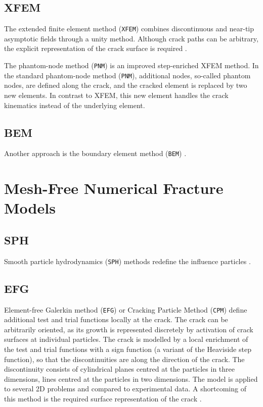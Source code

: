 \documentclass[format=acmtog, 12pt, screen=true, review=false]{acmart}
\begin{document}
\subsection{XFEM}

The extended finite element method (\texttt{XFEM}) \cite{Alt17, Xu10, Xu16} combines discontinuous and near-tip asymptotic fields through a unity method. \cite{Mun13} Although crack paths can be arbitrary, the explicit representation of the crack surface is required \cite{Rab04}. 

\bigbreak
The phantom-node method (\texttt{PNM}) \cite{VuB13} is an improved step-enriched XFEM method. In the standard phantom-node method (\texttt{PNM}), additional nodes, so-called phantom nodes, are defined along the crack, and the cracked element is replaced by two new elements. In contrast to XFEM, this new element handles the crack kinematics instead of the underlying element.

\subsection{BEM}

Another approach is the boundary element method (\texttt{BEM}) \cite{Mun13}.
\section{Mesh-Free Numerical Fracture Models}

\subsection{SPH}

Smooth particle hydrodynamics (\texttt{SPH}) \cite{Moh17, Moh18} methods redefine the influence particles \cite{Mun13}.

\subsection{EFG}

Element-free Galerkin method (\texttt{EFG}) or Cracking Particle Method (\texttt{CPM})  \cite{Pel16, Fle96, Rab04, Rab07, Rab10}
define additional test and trial functions locally at the crack. The crack can be arbitrarily oriented, as its growth is represented discretely by activation of crack surfaces at individual particles. The crack is modelled by a local enrichment of the test and trial functions with a sign function (a variant of the Heaviside step function), so that the discontinuities are along the direction of the crack. The discontinuity consists of cylindrical planes centred at the particles in three dimensions, lines centred at the particles in two dimensions. The model is applied to several 2D problems and compared to experimental data. A shortcoming of this method is the required surface representation of the crack \cite{Rab04}.
\end{document}
